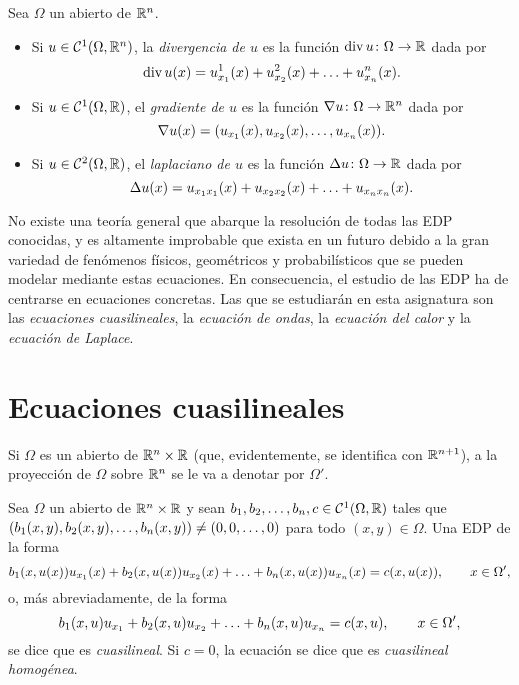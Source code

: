 \documentclass[a4paper, 12pt, extrafontsizes]{memoir}
\begin{document}
\begin{definition}
    Sea $\Omega$ un abierto de $\mathbb R^n$.
    \begin{itemize}
        \item Si $u \in \mathcal{C}^1(\Omega,\mathbb R^n)$, la \emph{divergencia de $u$} es la función $\textup{div} \, u \colon \Omega \to \mathbb R$ dada por
        \[\textup{div} \, u(x) = u^1_{x_1}(x)+u^2_{x_2}(x)+\mathellipsis+u^n_{x_n}(x).\]
        \item Si $u \in \mathcal{C}^1(\Omega,\mathbb R)$, el \emph{gradiente de $u$} es la función $\nabla{u} \colon \Omega \to \mathbb R^n$ dada por
        \[\nabla{u}(x) = (u_{x_1}(x),u_{x_2}(x),\mathellipsis,u_{x_n}(x)).\]
        \item Si $u \in \mathcal{C}^2(\Omega,\mathbb R)$, el \emph{laplaciano de $u$} es la función $\Delta{u} \colon \Omega \to \mathbb R$ dada por 
        \[\Delta{u}(x)=u_{x_1x_1}(x)+u_{x_2x_2}(x)+\mathellipsis+u_{x_nx_n}(x).\]
    \end{itemize}
\end{definition}

No existe una teoría general que abarque la resolución de todas las EDP conocidas, y es altamente improbable que exista en un futuro debido a la gran variedad de fenómenos físicos, geométricos y probabilísticos que se pueden modelar mediante estas ecuaciones. En consecuencia, el estudio de las EDP ha de centrarse en ecuaciones concretas. Las que se estudiarán en esta asignatura son las \emph{ecuaciones cuasilineales}, la \emph{ecuación de ondas}, la \emph{ecuación del calor} y la \emph{ecuación de Laplace}.

\chapter{Ecuaciones cuasilineales}

Si $\Omega$ es un abierto de $\mathbb R^n \times \mathbb R$ (que, evidentemente, se identifica con $\mathbb R^{n+1}$), a la proyección de $\Omega$ sobre $\mathbb R^n$ se le va a denotar por $\Omega'$.

\begin{definition}
    Sea $\Omega$ un abierto de $\mathbb R^{n} \times \mathbb R$ y sean $b_1,b_2,\mathellipsis,b_n,c \in \mathcal{C}^1(\Omega,\mathbb R)$ tales que $(b_1(x,y),b_2(x,y),\mathellipsis,b_n(x,y)) \neq (0,0,\mathellipsis,0)$
    para todo $(x,y) \in \Omega$. Una EDP de la forma
    \[b_1(x,u(x))u_{x_1}(x)+b_2(x,u(x))u_{x_2}(x)+\mathellipsis+b_n(x,u(x))u_{x_n}(x) = c(x,u(x)), \qquad x \in \Omega',\]
    o, más abreviadamente, de la forma
    \[b_1(x,u)u_{x_1}+b_2(x,u)u_{x_2}+\mathellipsis+b_n(x,u)u_{x_n} = c(x,u), \qquad x \in \Omega',\]
    se dice que es \emph{cuasilineal}. Si $c = 0$, la ecuación se dice que es \emph{cuasilineal homogénea}.
\end{definition}
\end{document}
